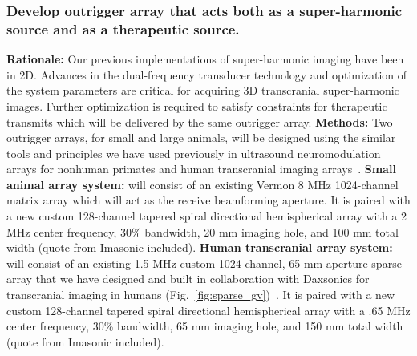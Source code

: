 \subsubsection{Develop outrigger array that acts both as a super-harmonic source and as a therapeutic source. \label{sec:xducer_design}}
\textbf{Rationale:} Our previous implementations of super-harmonic imaging have been in 2D. Advances in the dual-frequency transducer technology and optimization of the system parameters are critical for acquiring 3D transcranial super-harmonic images. Further optimization is required to satisfy constraints for therapeutic transmits which will be delivered by the same outrigger array. \textbf{Methods:} Two outrigger arrays, for small and large animals, will be designed using the similar tools and principles we have used previously in ultrasound neuromodulation arrays for nonhuman primates and human transcranial imaging arrays~\cite{jones2021transcranial,mccall2023development}.
\textbf{Small animal array system:} will consist of an existing Vermon 8 MHz 1024-channel matrix array which will act as the receive beamforming aperture. It is paired with a new custom 128-channel tapered spiral directional hemispherical array with a 2 MHz center frequency, 30\% bandwidth, 20 mm imaging hole, and 100 mm total width (quote from Imasonic included). 
\textbf{Human transcranial array system:} will consist of an existing 1.5 MHz custom 1024-channel, 65 mm aperture sparse array that we have designed and built in collaboration with Daxsonics for transcranial imaging in humans (Fig.~\ref{fig:sparse_gv})~\cite{mccall2023development}. It is paired with a new custom 128-channel tapered spiral directional hemispherical array with a .65 MHz center frequency, 30\% bandwidth, 65 mm imaging hole, and 150 mm total width (quote from Imasonic included).
